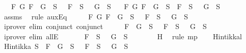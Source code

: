 \begin{isabellebody}
\ \ {\isasymand}\ {\isacharparenleft}{\isasymforall}F\ G{\isachardot}\ \isactrlbold {\isasymnot}{\isacharparenleft}F\ \isactrlbold {\isasymor}\ G{\isacharparenright}\ {\isasymin}\ S\ {\isasymlongrightarrow}\ \isactrlbold {\isasymnot}\ F\ {\isasymin}\ S\ {\isasymand}\ \isactrlbold {\isasymnot}\ G\ {\isasymin}\ S{\isacharparenright}\isanewline
\ \ {\isasymand}\ {\isacharparenleft}{\isasymforall}F\ G{\isachardot}\ \isactrlbold {\isasymnot}{\isacharparenleft}F\ \isactrlbold {\isasymrightarrow}\ G{\isacharparenright}\ {\isasymin}\ S\ {\isasymlongrightarrow}\ F\ {\isasymin}\ S\ {\isasymand}\ \isactrlbold {\isasymnot}\ G\ {\isasymin}\ S{\isacharparenright}{\isachardoublequoteclose}\isanewline
\ \ \ \isamarkupfalse%
\ assms\ \isamarkupfalse%
\ {\isacharparenleft}rule\ auxEq{\isacharparenright}\isanewline
\ \ \isamarkupfalse%
\ \isamarkupfalse%
\ {\isachardoublequoteopen}{\isasymforall}F\ G{\isachardot}\ \isactrlbold {\isasymnot}{\isacharparenleft}F\ \isactrlbold {\isasymand}\ G{\isacharparenright}\ {\isasymin}\ S\ {\isasymlongrightarrow}\ \isactrlbold {\isasymnot}\ F\ {\isasymin}\ S\ {\isasymor}\ \isactrlbold {\isasymnot}\ G\ {\isasymin}\ S{\isachardoublequoteclose}\isanewline
\ \ \ \ \isamarkupfalse%
\ {\isacharparenleft}iprover\ elim{\isacharcolon}\ conjunct{}\ conjunct{}{\isacharparenright}\isanewline
\ \ \isamarkupfalse%
\ \isamarkupfalse%
\ {\isachardoublequoteopen}\isactrlbold {\isasymnot}{\isacharparenleft}F\ \isactrlbold {\isasymand}\ G{\isacharparenright}\ {\isasymin}\ S\ {\isasymlongrightarrow}\ \isactrlbold {\isasymnot}\ F\ {\isasymin}\ S\ {\isasymor}\ \isactrlbold {\isasymnot}\ G\ {\isasymin}\ S{\isachardoublequoteclose}\isanewline
\ \ \ \ \isamarkupfalse%
\ {\isacharparenleft}iprover\ elim{\isacharcolon}\ allE{\isacharparenright}\isanewline
\ \ \ \ \isamarkupfalse%
\ {\isachardoublequoteopen}\isactrlbold {\isasymnot}\ F\ {\isasymin}\ S\ {\isasymor}\ \isactrlbold {\isasymnot}\ G\ {\isasymin}\ S{\isachardoublequoteclose}\isanewline
\ \ \ \ \ \ \isamarkupfalse%
\ H\ \isamarkupfalse%
\ {\isacharparenleft}rule\ mp{\isacharparenright}\isanewline
\ \ \isamarkupfalse%
%
\endisatagproof
{\isafoldproof}%
%
\isadelimproof
\isanewline
%
\endisadelimproof
\isanewline
{}\isamarkupfalse%
\ Hintikka{\isacharunderscore}l{}{\isacharcolon}\ \isanewline
\ {\isachardoublequoteopen}Hintikka\ S\ {\isasymLongrightarrow}\ \isactrlbold {\isasymnot}{\isacharparenleft}F\ \isactrlbold {\isasymand}\ G{\isacharparenright}\ {\isasymin}\ S\ {\isasymlongrightarrow}\ \isactrlbold {\isasymnot}\ F\ {\isasymin}\ S\ {\isasymor}\ \isactrlbold {\isasymnot}\ G\ {\isasymin}\ S{\isachardoublequoteclose}\isanewline

\end{isabellebody}
